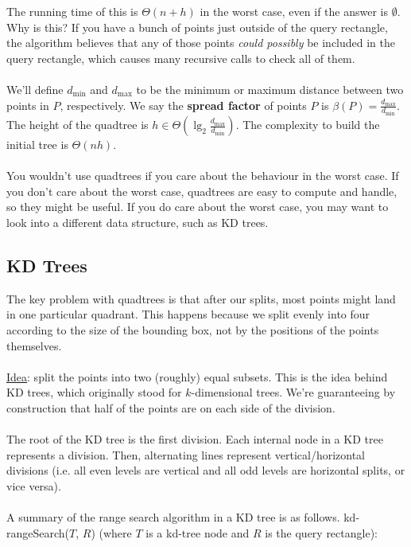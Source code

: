 \documentclass[]{article}
\theoremstyle{definition}
\begin{document}
			The running time of this is $\Theta(n + h)$ in the worst case, even if the answer is $\emptyset$. Why is this? If you have a bunch of points just outside of the query rectangle, the algorithm believes that any of those points \emph{could possibly} be included in the query rectangle, which causes many recursive calls to check all of them.
			\\ \\
			We'll define $d_{\text{min}}$ and $d_{\text{max}}$ to be the minimum or maximum distance between two points in $P$, respectively. We say the \textbf{spread factor} of points $P$ is $\beta(P) = \frac{d_{\text{max}}}{d_{\text{min}}}$. The height of the quadtree is $h \in \Theta(\lg_2 \frac{d_{\text{max}}}{d_{\text{min}}})$. The complexity to build the initial tree is $\Theta(nh)$.
			\\ \\
			You wouldn't use quadtrees if you care about the behaviour in the worst case. If you don't care about the worst case, quadtrees are easy to compute and handle, so they might be useful. If you do care about the worst case, you may want to look into a different data structure, such as KD trees.
		\subsection{KD Trees}
			The key problem with quadtrees is that after our splits, most points might land in one particular quadrant. This happens because we split evenly into four according to the size of the bounding box, not by the positions of the points themselves.
			\\ \\
			\underline{Idea}: split the points into two (roughly) equal subsets. This is the idea behind KD trees, which originally stood for $k$-dimensional trees. We're guaranteeing by construction that half of the points are on each side of the division.
			\\ \\
			The root of the KD tree is the first division. Each internal node in a KD tree represents a division. Then, alternating lines represent vertical/horizontal divisions (i.e. all even levels are vertical and all odd levels are horizontal splits, or vice versa).
			\\ \\
			A summary of the range search algorithm in a KD tree is as follows. kd-rangeSearch($T$, $R$) (where $T$ is a kd-tree node and $R$ is the query rectangle): \\
			\begin{algorithm}[H]
			\end{algorithm}
\end{document}
